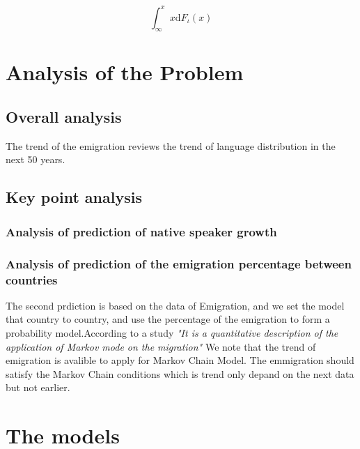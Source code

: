 \documentclass{mcmthesis}
\begin{document}
\begin{Theorem} \label{thm:latex}
\begin{equation}\int^x_\infty x \mathrm{d}F_\iota(x)
\end{equation}
\end{Theorem}

\section{Analysis of the Problem}
\subsection{Overall analysis}

The trend of the emigration reviews the trend of language distribution in the next 50 years.

\subsection{Key point analysis}
\subsubsection{Analysis of prediction of native speaker growth}

\subsubsection{Analysis of prediction of the emigration percentage between countries}
\qquad The second prdiction is based on the data of Emigration, and we set the model that country to country, and use the percentage of the emigration to 
form a probability model.According to a study\cite{tec} \emph{"It is a quantitative description of the application of Markov
mode on the migration"} We note that the trend of emigration is avalible to apply for Markov Chain Model.  
The emmigration should satisfy the Markov Chain conditions which is trend only depand on the next data but not earlier.

\section{The models}
\end{document}
